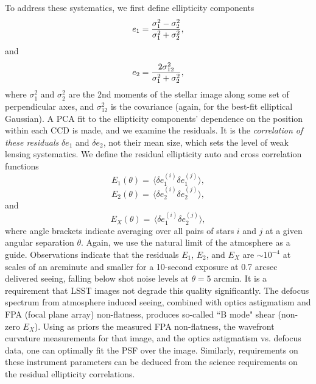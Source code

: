 To address these systematics, we first define ellipticity components
\begin{equation}
 e_1 = {\sigma_1^2 - \sigma_2^2 \over \sigma_1^2 + \sigma_2^2},
\end{equation}
and
\begin{equation}
 e_2 = {2 \sigma_{12}^2 \over \sigma_1^2 + \sigma_2^2},
\end{equation}
where $\sigma_1^2$ and $\sigma_2^2$ are the 2nd moments of the stellar
image along some set of perpendicular axes, and $\sigma_{12}^2$ is the
covariance (again, for the best-fit elliptical Gaussian).
A PCA fit to the ellipticity components’ dependence on the position within
each CCD is made, and we examine the residuals.
It is the {\it correlation of these residuals} $\delta e_1$
and $\delta e_2$, not their
mean size, which sets the level of weak lensing systematics.  We
define the residual ellipticity auto and cross correlation functions
\begin{equation}
 E_1(\theta) = \, \langle \delta e_1^{(i)}\delta e_1^{(j)} \rangle,
\end{equation}
\begin{equation}
 E_2(\theta) = \, \langle \delta e_2^{(i)}\delta e_2^{(j)} \rangle,
\end{equation}
and
\begin{equation}
 E_X(\theta) = \, \langle \delta e_1^{(i)}\delta e_2^{(j)} \rangle,
\end{equation}
where angle brackets indicate averaging over all pairs of stars $i$ and
$j$ at a given angular separation $\theta$.  Again, we use the natural
limit of the atmosphere as a guide.  Observations indicate that the residuals $E_1$,
$E_2$, and $E_X$ are $\sim 10^{-4}$ at scales of an arcminute and smaller for
a 10-second exposure at 0.7 arcsec delivered seeing, falling below shot noise
levels at $\theta = 5$ arcmin.  It is a requirement that LSST images not degrade
this quality significantly. The defocus spectrum from atmosphere induced seeing,
combined with optics astigmatism and FPA (focal plane array) non-flatness, produces
so-called ``B mode" shear (non-zero $E_X$). Using as priors the measured FPA non-flatness, the wavefront
curvature measurements for that image, and the optics astigmatism vs. defocus
data,
one can optimally fit the PSF over the image. Similarly, requirements on these
instrument parameters can be deduced from the science requirements on the
residual ellipticity correlations.




